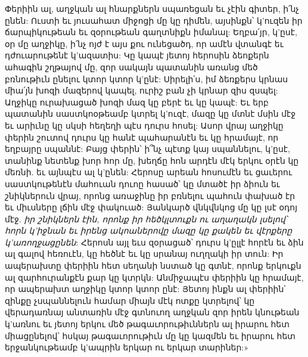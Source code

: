 \documentclass{article}
\begin{document}
{Փերիին ալ, աղջկան ալ հնարքներն սպառեցան եւ չէին գիտեր, ի՛նչ ընեն: Ուստի եւ յուսահատ միջոցի մը կը դիմեն, այսինքն՝ կ'ուզեն իր ճարպիկութեան եւ զօրութեան գաղտնիքն իմանալ: Եղբա՛յր, կ'ըսէ, օր մը աղջիկը, ի՛նչ ոյժ է այս քու ունեցածդ, որ ամէն վտանգէ եւ դժուարութենէ կ'ազատիս: Կը կապէ յետոյ հերոսին ձեոքերն ահագին շղթայով մը, զոր սակայն պատանին առանց մեծ բռնութիւն ընելու կտոր կտոր կ'ընէ: Սիրելի՛ս, իմ ձեռքերս կրնաս միա՛յն խոզի մազերով կապել, ուրիշ բան չի կրնար զիս զսպել: Աղջիկը ուրախացած խոզի մազ կը բերէ եւ կը կապէ: Եւ երբ պատանին սաստկոօթեամբ կտրել կ'ուզէ, մազը կը մտնէ մսին մէջ եւ արիւնը կը սկսի հեղեղի պէս դուրս հոսել: Ասոր վրայ աղջիկը փերին շուտով դուրս կը հանէ պահարանէն եւ կը հրամայէ, որ եղբայրը սպաննէ: Բայց փերին՝ ի՞նչ պէտք կայ սպաննելու, կ'ըսէ, տանինք նետենք խոր հոր մը, խեղճը հոն արդէն մէկ երկու օրէն կը մեռնի. եւ այնպէս ալ կ'ընեն: Հերոսը արեան հոսումէն եւ ցաւերու սաստկութենէն մահուան դուոը հասած՝ կը մտածէ իր ձիուն եւ շնիկներուն վրայ, որոնց առաջինը իր բռնելու պահուն փախած էր եւ միւսները լճին մէջ փակուած: Յանկարծ վնկվնկոց մը կը լսէ օդոյ մէջ. \emph{իր շնիկներն էին, որոնք իր հեծկլտուքն ու աղաղակն լսելով՝ հորն կ'իջնան եւ իրենց ակոաներովը մազը կը քակեն եւ վէրքերը կ'առողջացընեն}: Հերոսն այլ եւս զօրացած՝ դուրս կ'ըլլէ հորէն եւ ձին ալ գալով հեռուէն, կը հեծնէ եւ կը սրանայ ուղղակի իր տուն: Իր ապերախտը փերիին հետ սեղանի նստած կը գտնէ, որոնք երկուքն ալ զարհուրանքէն քար կը կտրկն: Անմիջապէս փերիին կը հրամայէ, որ ապերախտ աղջիկը կտոր կտոր ընէ: Յետոյ ինքն ալ փերիին՝ զինքը չսպաննելուն համար միայն մէկ ոտքը կտրելով՝ կը վերադառնայ անտառին մէջ գտնուող աղջկան զոր իրեն կնութեան կ'առնու եւ յետոյ երկու մեծ թագաւորութիւններն ալ իրարու հետ միացընելով՝ հսկայ թագաւորութիւն մը կը կազմեն եւ իրարու հետ երջանկութեամբ կ'ապրին երկար ու երկար տարիներ:»

}
\end{document}
